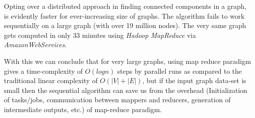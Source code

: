 Opting over a distributed approach in finding connected components in a graph, is evidently faster for ever-increasing size of graphs. The algorithm fails to work sequentially on a large graph (with over 19 million nodes). The very same graph gets computed in only 33 minutes using \textit{Hadoop MapReduce} via \textit{AmazonWebServices}.

With this we can conclude that for very large graphs, using map reduce paradigm gives a time-complexity of \textit{$O(logn)$} steps by parallel runs as compared to the traditional linear complexity of \textit{$O(|V| + |E|)$}, but if the input graph data-set is small then the sequential algorithm can save us from the overhead  (\eg Initialization of tasks/jobs, communication between mappers and reducers, generation of intermediate outputs, etc.) of map-reduce paradigm.